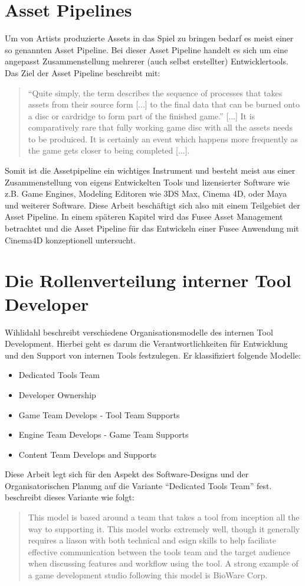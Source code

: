 \documentclass[pagesize, paper=a4, fontsize=12pt, titlepage=true, headings=small, headnosepline, abstractoff, liststotoc, nochapterprefix, plainheadsepline, twoside]{scrreprt}
\begin{document}
\section{Asset Pipelines}
Um von Artists produzierte Assets in das Spiel zu bringen bedarf es meist einer so genannten Asset Pipeline. Bei dieser Asset Pipeline handelt es sich um eine angepasst Zusammenstellung mehrerer (auch selbst erstellter) Entwicklertools. Das Ziel der Asset Pipeline beschreibt \autocite{Carter2004} mit:
\begin{quote}
“Quite simply, the term describes the sequence of processes that takes assets from their source form [...] to the final data that can be burned onto a disc or cardridge to form part of the finished game.”
[...]
It is comparatively rare that fully working game disc with all the assets needs to be produiced. It is certainly an event which happens more frequently as the game gets closer to being completed [...]. 
\end{quote}
Somit ist die Assetpipeline ein wichtiges Instrument und besteht meist aus einer Zusammenstellung von eigens Entwickelten Tools und lizensierter Software wie z.B. Game Engines, Modeling Editoren wie 3DS Max, Cinema 4D, oder Maya und weiterer Software. Diese Arbeit beschäftigt sich also mit einem Teilgebiet der Asset Pipeline. In einem späteren Kapitel wird das Fusee Asset Management betrachtet und die Asset Pipeline für das Entwickeln einer Fusee Anwendung mit Cinema4D konzeptionell untersucht.

\section{Die Rollenverteilung interner Tool Developer}
Wihlidahl \autocite[S. 5]{Wihlidal2006} beschreibt verschiedene Organisationsmodelle des internen Tool Development. Hierbei geht es darum die Verantwortlichkeiten für Entwicklung und den Support von internen Tools festzulegen. Er klassifiziert folgende Modelle:
\begin{itemize}
\item Dedicated Tools Team
\item Developer Ownership
\item Game Team Develops - Tool Team Supports
\item Engine Team Develops - Game Team Supports
\item Content Team Develops and Supports
\end{itemize}

Diese Arbeit legt sich für den Aspekt des Software-Designs und der Organisatorischen Planung auf die Variante “Dedicated Tools Team” fest. \autocite{Wihlidal2006} beschreibt dieses Variante wie folgt:
\begin{quote}
This model is based around a team that takes a tool from inception all the way to supporting it. This model works extremely well, though it generally requires a liason with both technical and esign skills to help faciliate effective communication between the tools team and the target audience when discussing features and workflow using the tool. A strong example of a game development studio following this model is BioWare Corp. \autocite[5]{Wihlidal2006}
\end{quote}
\end{document}
